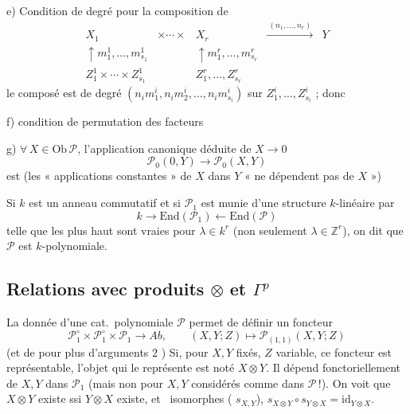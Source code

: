 \documentclass[11pt,a4paper]{article}
\begin{document}
e) Condition de degré pour la composition de
\[
\begin{array}{ccccc}
X_1 & \times \cdots \times & X_r & \xrightarrow{\ (n_1, \ldots, n_r)\ } &
Y \\
\uparrow {\scriptstyle m^{1}_{1}, \ldots, m^{1}_{s_1}} & &
\uparrow {\scriptstyle m^{r}_{1}, \ldots, m^{r}_{s_r}} & & \\
Z^{1}_{1} \times \cdots \times Z^{1}_{s_1} & & Z^{r}_{1}, \ldots,
Z^{r}_{s_r} & &
\end{array}
\]
le composé est de degré $(n_i m^{i}_{1}, n_i m^{i}_{2}, \ldots,
n_i m^{i}_{s_i})$ sur $Z^{i}_{1}, \ldots, Z^{i}_{s_i}$ ; donc

f) condition  \struck{\ill{}} de permutation
des facteurs

g) $\forall\, X \in \mathrm{Ob}\,\mathcal{P}$, l'application canonique
déduite de $X \to 0$
\[
\mathcal{P}_0(0, Y) \longrightarrow \mathcal{P}_0(X, Y)
\]
est  (les « applications constantes » de $X$ dans
$Y$ « ne dépendent pas de $X$ »)

Si $k$ est un anneau commutatif et si $\mathcal{P}_1$ est munie d'une
structure $k$-linéaire par
\[
k \longrightarrow \mathrm{End}(\mathcal{P}_1) \longleftarrow
\mathrm{End}(\mathcal{P})
\]
 telle que les  plus haut
sont vraies pour $\lambda \in k^{r}$ (non seulement $\lambda \in
\mathbb{Z}^{r}$), on dit que $\mathcal{P}$ est $k$-polynomiale.

\subsection*{Relations avec produits $\otimes$ et $\Gamma^{p}$}

La donnée d'une cat.\ polynomiale $\mathcal{P}$ permet de définir un
foncteur 
\[
\mathcal{P}_1^{\circ} \times \mathcal{P}_1^{\circ} \times \mathcal{P}_1
\longrightarrow \mathit{Ab}, \qquad
(X, Y; Z) \longmapsto \mathcal{P}_{(1,1)}(X, Y; Z)
\]
(et de  pour plus d'arguments $2$ )
Si, pour $X, Y$ fixés, $Z$ variable, ce foncteur est représentable,
l'objet qui le représente est noté $X \otimes Y$. Il dépend
fonctoriellement de $X, Y$ dans $\mathcal{P}_1$ (mais non pour $X, Y$
\struck{\ill{}} considérés comme dans $\mathcal{P}$\,!).
\struck{\ill{}} On voit que $X \otimes Y$ existe ssi $Y \otimes X$
existe, et   \
isomorphes ( $s_{X,Y}$), 
$s_{X \otimes Y} \circ s_{Y \otimes X} = \mathrm{id}_{Y \otimes X}$.
\end{document}

